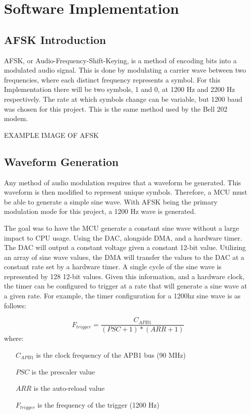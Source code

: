 \documentclass[notitlepage]{report}
\begin{document}
\section{Software Implementation}
\subsection{AFSK Introduction}
AFSK, or Audio-Frequency-Shift-Keying, is a method of encoding bits into a modulated audio signal. This is done by modulating a carrier wave between two frequencies, where each distinct frequency represents a symbol. For this Implementation there will be two symbols, 1 and 0, at 1200 Hz and 2200 Hz respectively. The rate at which symbols change can be variable, but 1200 baud was chosen for this project. This is the same method used by the Bell 202 modem.

EXAMPLE IMAGE OF AFSK

\subsection{Waveform Generation}
Any method of audio modulation requires that a waveform be generated. This waveform is then modified to represent unique symbols. Therefore, a MCU must be able to generate a simple sine wave. With AFSK being the primary modulation mode for this project, a 1200 Hz wave is generated.

The goal was to have the MCU generate a constant sine wave without a large impact to CPU usage. Using the DAC, alongside DMA, and a hardware timer. The DAC will output a constant voltage given a constant 12-bit value. Utilizing an array of sine wave values, the DMA will transfer the values to the DAC at a constant rate set by a hardware timer. A single cycle of the sine wave is represented by 128 12-bit values. Given this information, and a hardware clock, the timer can be configured to trigger at a rate that will generate a sine wave at a given rate. For example, the timer configuration for a 1200hz sine wave is as follows:

\[
  F_{trigger} = \frac{C_{APB1}}{(PSC+1)*(ARR+1)}
\]
where:
\begin{itemize}
  \item[$C_{APB1}$] is the clock frequency of the APB1 bus (90 MHz)
  \item[$PSC$] is the prescaler value
  \item[$ARR$] is the auto-reload value
  \item[$F_{trigger}$] is the frequency of the trigger (1200 Hz)
\end{itemize}
\end{document}
